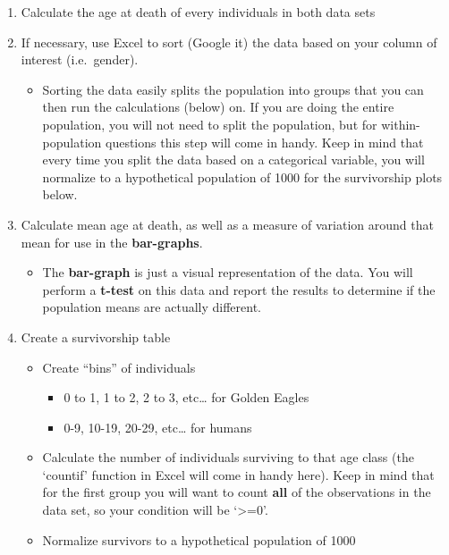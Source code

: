 \documentclass[]{book}
\providecommand{\tightlist}{%
  \setlength{\itemsep}{0pt}\setlength{\parskip}{0pt}}
\theoremstyle{definition}
\theoremstyle{definition}
\theoremstyle{definition}
\theoremstyle{remark}
\begin{document}
\begin{enumerate}
\def\labelenumi{\arabic{enumi}.}
\tightlist
\item
  Calculate the age at death of every individuals in both data sets
\item
  If necessary, use Excel to sort (Google it) the data based on your
  column of interest (i.e.~gender).

  \begin{itemize}
  \tightlist
  \item
    Sorting the data easily splits the population into groups that you
    can then run the calculations (below) on. If you are doing the
    entire population, you will not need to split the population, but
    for within-population questions this step will come in handy. Keep
    in mind that every time you split the data based on a categorical
    variable, you will normalize to a hypothetical population of 1000
    for the survivorship plots below.
  \end{itemize}
\item
  Calculate mean age at death, as well as a measure of variation around
  that mean for use in the \textbf{bar-graphs}.

  \begin{itemize}
  \tightlist
  \item
    The \textbf{bar-graph} is just a visual representation of the data.
    You will perform a \textbf{t-test} on this data and report the
    results to determine if the population means are actually different.
  \end{itemize}
\item
  Create a survivorship table

  \begin{itemize}
  \tightlist
  \item
    Create ``bins'' of individuals

    \begin{itemize}
    \tightlist
    \item
      0 to 1, 1 to 2, 2 to 3, etc\ldots{} for Golden Eagles
    \item
      0-9, 10-19, 20-29, etc\ldots{} for humans
    \end{itemize}
  \item
    Calculate the number of individuals surviving to that age class (the
    `countif' function in Excel will come in handy here). Keep in mind
    that for the first group you will want to count \textbf{all} of the
    observations in the data set, so your condition will be
    `\textgreater{}=0'.
  \item
    Normalize survivors to a hypothetical population of 1000


\end{itemize}
\end{enumerate}
\end{document}
